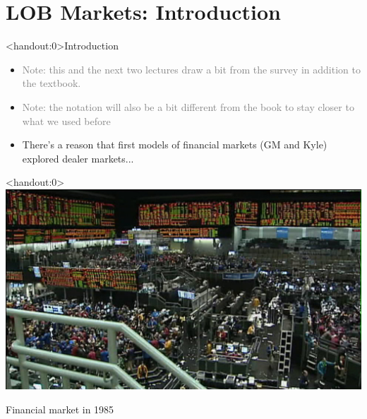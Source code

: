 \documentclass[english,10pt
,aspectratio=169
]{beamer}
\begin{document}



\section{LOB Markets: Introduction}

\begin{frame}<handout:0>{Introduction}
	\begin{itemize}
		\item \textcolor<2>{gray}{Note: this and the next two lectures draw a bit from the \cite{parlour_limit_2008} survey in addition to the textbook.}
		\item \textcolor<2>{gray}{Note: the notation will also be a bit different from the book to stay closer to what we used before}
		
		\pause \bigskip 
		
		\item There's a reason that first models of financial markets (GM and Kyle) explored dealer markets...
	\end{itemize}
\end{frame}


\begin{frame}<handout:0>
	\centering
	\includegraphics[scale=0.5]{pics/mkt20}
	
	Financial market in 1985
\end{frame}
\end{document}
